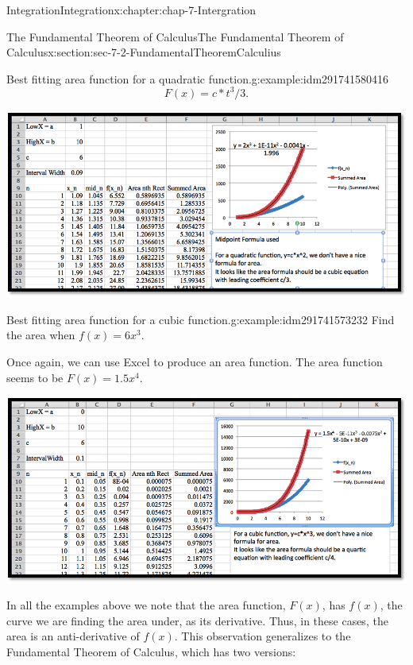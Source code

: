 \documentclass[oneside,10pt,]{book}
\numberwithin{equation}{section}
\begin{document}
\begin{chapterptx}{Integration}{}{Integration}{}{}{x:chapter:chap-7-Intergration}
\begin{sectionptx}{The Fundamental Theorem of Calculus}{}{The Fundamental Theorem of Calculus}{}{}{x:section:sec-7-2-FundamentalTheoremCalculius}
\begin{example}{Best fitting area function for a quadratic function.}{g:example:idm291741580416}
%
\begin{equation*}
F(x)=c*t^3/3\text{.}
\end{equation*}
\begin{sidebyside}{1}{0}{0}{0}%
\begin{sbspanel}{1}%
\includegraphics[width=\linewidth]{images/sec7-2-7.png}
\end{sbspanel}%
\end{sidebyside}%
\end{example}
\begin{example}{Best fitting area function for a cubic function.}{g:example:idm291741573232}%
Find the area when \(f(x)=6 x^3\).%
\par
Once again, we can use Excel to produce an area function.  The area function seems to be \(F(x)=1.5 x^4\).%
\begin{sidebyside}{1}{0}{0}{0}%
\begin{sbspanel}{1}%
\includegraphics[width=\linewidth]{images/sec7-2-8.png}
\end{sbspanel}%
\end{sidebyside}%
\end{example}
In all the examples above we note that the area function, \(F(x)\),  has \(f(x)\), the curve we are finding the area under, as its derivative.  Thus, in these cases, the area is an anti-derivative of \(f(x)\).  This observation generalizes to the Fundamental Theorem of Calculus, which has two versions:%

\end{sectionptx}
\end{chapterptx}
\end{document}
